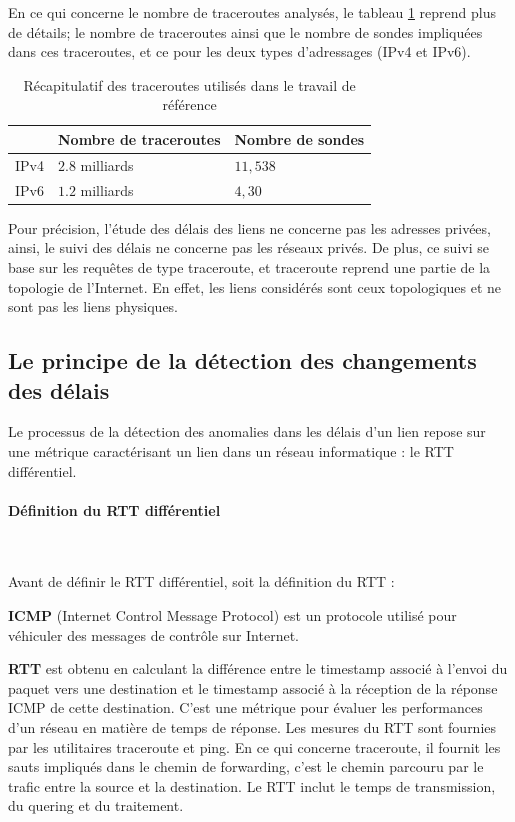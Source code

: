 En ce qui concerne le nombre de  traceroutes analysés, le tableau \ref{tab:dataset} reprend plus de détails; le nombre de traceroutes ainsi que le nombre de sondes impliquées dans ces traceroutes, et ce pour les deux types d'adressages (IPv4 et IPv6). 

\begin{table}[H]
	\centering
	\begin{tabular}{|l|l|l|}
		\hline
		& \textbf{Nombre de traceroute}s& \textbf{Nombre de sondes}\\ \hline
		IPv4		&$ 2.8 $ milliards & $ 11,538 $\\ \hline
		IPv6	&	$ 1.2 $ milliards & $ 4,30 $ \\ \hline
	\end{tabular}
	\caption{Récapitulatif des traceroutes utilisés dans le travail de référence }
	\label{tab:dataset}
\end{table}


Pour précision, l'étude des délais des liens ne concerne pas  les adresses privées, ainsi, le suivi des délais ne concerne pas les réseaux privés.  De plus, ce  suivi  se base sur les requêtes de type traceroute, et traceroute reprend une partie de la topologie de l'Internet. En effet, les liens considérés sont ceux topologiques et ne sont pas  les liens physiques. 

\subsection{Le principe de la détection des changements des délais} \label{principe-de-detection}

Le processus de la détection des anomalies dans les délais d'un lien repose sur une métrique caractérisant un lien dans un réseau informatique : le RTT différentiel.
\paragraph{Définition du RTT différentiel }~

Avant de définir le RTT différentiel, soit la définition du RTT :


\begin{tcolorbox}
	
	\textbf{ICMP} (Internet Control Message Protocol) est un protocole utilisé pour véhiculer des messages de contrôle sur Internet.
	
	\textbf{RTT} est obtenu en calculant la différence entre le timestamp associé à l'envoi du paquet vers une destination  et le timestamp associé à la réception de la réponse ICMP de cette destination. C'est une métrique pour évaluer les performances d'un réseau en matière de temps de réponse. Les mesures du RTT sont fournies par les utilitaires traceroute et ping. En ce qui concerne traceroute,  il fournit les sauts impliqués dans le  chemin de forwarding, c'est le chemin parcouru par le trafic entre la source et la destination.  Le RTT inclut le temps de transmission, du quering et  du traitement. 
\end{tcolorbox}

